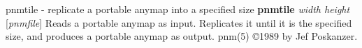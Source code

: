 %

\newpage
%

pnmtile - replicate a portable anymap into a specified size
{\bf pnmtile}
{\it width height}
{\rm [}{\it pnmfile}{\rm ]}
Reads a portable anymap as input.
Replicates it until it is the specified size,
and produces a portable anymap as output.
pnm(5)
\copyright 1989 by Jef Poskanzer.
%
 
%

